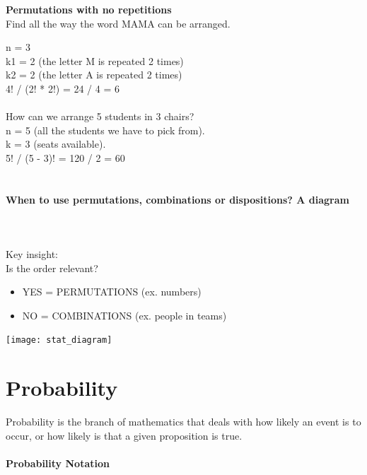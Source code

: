 \documentclass{article}
\begin{document}
\textbf{Permutations with no repetitions} \\
Find all the way the word MAMA can be arranged. 

n = 3 \\ 
k1 = 2 (the letter M is repeated 2 times) \\
k2 = 2 (the letter A is repeated 2 times) \\ 
4! / (2! * 2!) = 24 / 4 = 6 \mbox{} \\
\mbox{} \\
How can we arrange 5 students in 3 chairs? \\ 

n = 5 (all the students we have to pick from). \\
k = 3 (seats available). \\
5! / (5 - 3)! = 120 / 2 = 60 \mbox{} \\
\mbox{} \\

\paragraph{When to use permutations, combinations or dispositions? A diagram}\mbox{} \\
\mbox{} \\
Key insight: \\ 
Is the order relevant?
\begin{itemize}
    \item YES = PERMUTATIONS (ex. numbers)
    \item NO = COMBINATIONS (ex. people in teams)
\end{itemize}

\begin{adjustwidth}{-2.0cm}{-3.0cm}

    \texttt{[image: stat\_diagram]}

\end{adjustwidth}
\clearpage

\section{Probability}
Probability is the branch of mathematics that deals with how likely an event is to occur, or how likely is that a given proposition is true.

\paragraph{Probability Notation}\mbox{} \\
\end{document}

